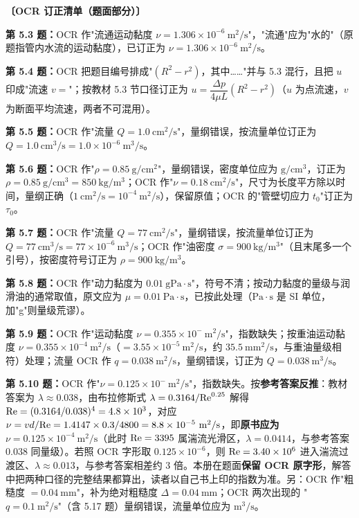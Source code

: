 \begin{tishi}
\textbf{〔OCR 订正清单（题面部分）〕}
\begin{xiaowen}
\item \textbf{第 5.3 题：}OCR 作"流通运动黏度 $\nu=1.306\times10^{-6}\ \mathrm{m^2/s}$"，"流通"应为"水的"（原题指管内水流的运动黏度），已订正为 $\nu=1.306\times10^{-6}\ \mathrm{m^2/s}$。
\item \textbf{第 5.4 题：}OCR 把题目编号排成"$(R^2-r^2)$，其中……"并与 5.3 混行，且把 $u$ 印成"流速 $v=$"；按教材 5.3 节口径订正为 $u=\dfrac{\Delta p}{4\mu L}\left(R^2-r^2\right)$（$u$ 为点流速，$v$ 为断面平均流速，两者不可混用）。
\item \textbf{第 5.5 题：}OCR 作"流量 $Q=1.0\ \mathrm{cm^2/s}$"，量纲错误，按流量单位订正为 $Q=1.0\ \mathrm{cm^3/s}=1.0\times10^{-6}\ \mathrm{m^3/s}$。
\item \textbf{第 5.6 题：}OCR 作"$\rho=0.85\ \mathrm{g/cm^2}$"，量纲错误，密度单位应为 $\mathrm{g/cm^3}$，订正为 $\rho=0.85\ \mathrm{g/cm^3}=850\ \mathrm{kg/m^3}$；OCR 作"$\nu=0.18\ \mathrm{cm^2/s}$"，尺寸为长度平方除以时间，量纲正确（$1\ \mathrm{cm^2/s}=10^{-4}\ \mathrm{m^2/s}$），保留原值；OCR 的"管壁切应力 $t_0$"订正为 $\tau_0$。
\item \textbf{第 5.7 题：}OCR 作"流量 $Q=77\ \mathrm{cm^2/s}$"，量纲错误，按流量单位订正为 $Q=77\ \mathrm{cm^3/s}=77\times10^{-6}\ \mathrm{m^3/s}$；OCR 作"油密度 $\sigma=900\ \mathrm{kg/m^3}$"（且末尾多一个引号），按密度符号订正为 $\rho=900\ \mathrm{kg/m^3}$。
\item \textbf{第 5.8 题：}OCR 作"动力黏度为 $0.01\ \mathrm{gPa\cdot s}$"，符号不清；按动力黏度的量级与润滑油的通常取值，原文应为 $\mu=0.01\ \mathrm{Pa\cdot s}$，已按此处理（$\mathrm{Pa\cdot s}$ 是 SI 单位，加"g"则量级荒谬）。
\item \textbf{第 5.9 题：}OCR 作"运动黏度 $\nu=0.355\times10^{-}\ \mathrm{m^2/s}$"，指数缺失；按重油运动黏度 $\nu=0.355\times10^{-4}\ \mathrm{m^2/s}$（$=3.55\times10^{-5}\ \mathrm{m^2/s}$，约 $35.5\ \mathrm{mm^2/s}$，与重油量级相符）处理；流量 OCR 作 $q=0.038\ \mathrm{m^2/s}$，量纲错误，订正为 $Q=0.038\ \mathrm{m^3/s}$。
\item \textbf{第 5.10 题：}OCR 作"$\nu=0.125\times10^{-}\ \mathrm{m^2/s}$"，指数缺失。按\textbf{参考答案反推}：教材答案为 $\lambda\approx0.038$，由布拉修斯式 $\lambda=0.3164/\mathrm{Re}^{0.25}$ 解得 $\mathrm{Re}=(0.3164/0.038)^{4}=4.8\times10^3$，对应 $\nu=vd/\Rey=1.4147\times0.3/4800=8.8\times10^{-5}\ \mathrm{m^2/s}$，即\textbf{原书应为 $\nu=0.125\times10^{-4}\ \mathrm{m^2/s}$}（此时 $\mathrm{Re}=3395$ 属湍流光滑区，$\lambda=0.0414$，与参考答案 $0.038$ 同量级）。若照 OCR 字形取 $0.125\times10^{-6}$，则 $\mathrm{Re}=3.40\times10^6$ 进入湍流过渡区、$\lambda\approx0.013$，与参考答案相差约 3 倍。本册在题面\textbf{保留 OCR 原字形}，解答中把两种口径的完整结果都算出，读者以自己书上印的指数为准。另：OCR 作"粗糙度 $=0.04\ \mathrm{mm}$"，补为绝对粗糙度 $\Delta=0.04\ \mathrm{mm}$；OCR 两次出现的 "$q=0.1\ \mathrm{m^2/s}$"（含 5.17 题）量纲错误，流量单位应为 $\mathrm{m^3/s}$。

\end{xiaowen}
\end{tishi}
